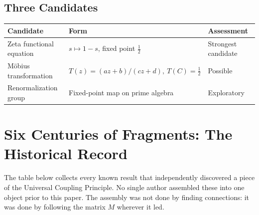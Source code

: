 \documentclass[12pt]{article}
\begin{document}
\subsection{Three Candidates}

\begin{center}
\renewcommand{\arraystretch}{1.4}
\begin{tabular}{lll}
\toprule
Candidate & Form & Assessment \\
\midrule
Zeta functional equation
& $s \mapsto 1-s$, fixed point $\tfrac{1}{2}$
& Strongest candidate \\
M\"{o}bius transformation
& $T(z) = (az+b)/(cz+d),\ T(C)=\tfrac{1}{2}$
& Possible \\
Renormalization group
& Fixed-point map on prime algebra
& Exploratory \\
\bottomrule
\end{tabular}
\end{center}

\section{Six Centuries of Fragments: The Historical Record}

The table below collects every known result that independently
discovered a piece of the Universal Coupling Principle.
No single author assembled these into one object prior to
this paper. The assembly was not done by finding connections:
it was done by following the matrix $M$ wherever it led.
\end{document}
